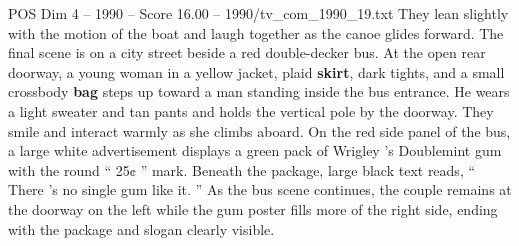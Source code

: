 \begin{textsample}{POS Dim 4 – 1990 – Score 16.00 – 1990/tv\_com\_1990\_19.txt}
They lean slightly with the motion of the boat and laugh together as the canoe glides forward.
The final scene is on a city street beside a red double-decker bus.
At the open rear doorway, a young woman in a yellow jacket, plaid \textbf{skirt}, dark tights, and a small crossbody \textbf{bag} steps up toward a man standing inside the bus entrance.
He wears a light sweater and tan pants and holds the vertical pole by the doorway.
They smile and interact warmly as she climbs aboard.
On the red side panel of the bus, a large white advertisement displays a green pack of Wrigley ’s Doublemint gum with the round “ 25¢ ” mark.
Beneath the package, large black text reads, “ There ’s no single gum like it. ” As the bus scene continues, the couple remains at the doorway on the left while the gum poster fills more of the right side, ending with the package and slogan clearly visible.

\end{textsample}
